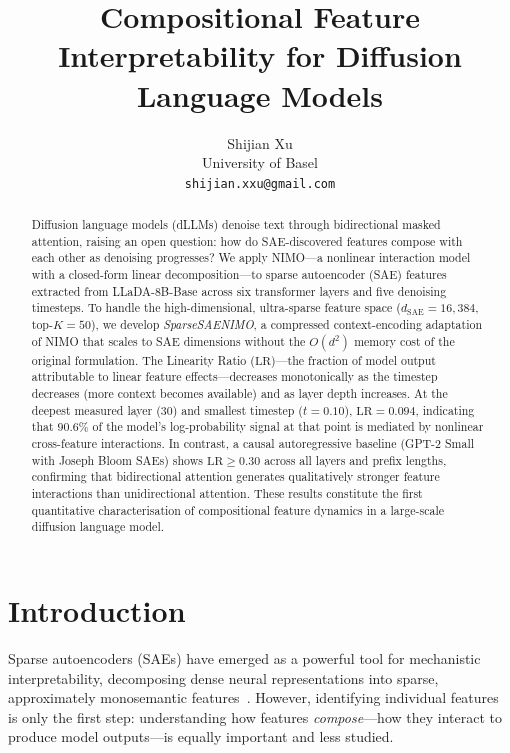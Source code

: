 \documentclass[11pt]{article}
\title{%
    \textbf{Compositional Feature Interpretability for Diffusion Language Models}%
}
\author{
    Shijian Xu \\
    University of Basel \\
    \texttt{shijian.xxu@gmail.com}
}
\date{}
\newcommand{\LR}{\mathrm{LR}}
\begin{document}
\maketitle

\begin{abstract}
Diffusion language models (dLLMs) denoise text through bidirectional masked attention, raising an open question: how do SAE-discovered features compose with each other as denoising progresses?
We apply NIMO---a nonlinear interaction model with a closed-form linear decomposition---to sparse autoencoder (SAE) features extracted from LLaDA-8B-Base across six transformer layers and five denoising timesteps.
To handle the high-dimensional, ultra-sparse feature space ($d_\mathrm{SAE} = 16{,}384$, top-$K = 50$), we develop \emph{SparseSAENIMO}, a compressed context-encoding adaptation of NIMO that scales to SAE dimensions without the $O(d^2)$ memory cost of the original formulation.
The Linearity Ratio ($\LR$)---the fraction of model output attributable to linear feature effects---decreases monotonically as the timestep decreases (more context becomes available) and as layer depth increases.
At the deepest measured layer (30) and smallest timestep ($t = 0.10$), $\LR = 0.094$, indicating that $90.6\%$ of the model's log-probability signal at that point is mediated by nonlinear cross-feature interactions.
In contrast, a causal autoregressive baseline (GPT-2 Small with Joseph Bloom SAEs) shows $\LR \ge 0.30$ across all layers and prefix lengths, confirming that bidirectional attention generates qualitatively stronger feature interactions than unidirectional attention.
These results constitute the first quantitative characterisation of compositional feature dynamics in a large-scale diffusion language model.
\end{abstract}

\section{Introduction}

Sparse autoencoders (SAEs) have emerged as a powerful tool for mechanistic interpretability, decomposing dense neural representations into sparse, approximately monosemantic features~\citep{cunningham2023sparse,templeton2024scaling}.
However, identifying individual features is only the first step: understanding how features \emph{compose}---how they interact to produce model outputs---is equally important and less studied.
\end{document}
